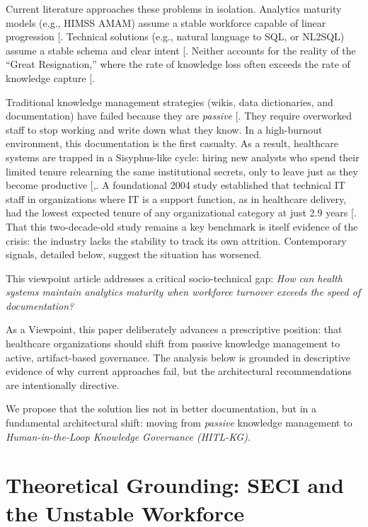 \documentclass[
  american,
  11pt,
  letterpaper,
  oneside  ,captions=tableheading
]{scrartcl}
\begin{document}
Current literature approaches these problems in isolation. Analytics
maturity models (e.g., HIMSS AMAM) assume a stable workforce capable of
linear progression {[}\citeproc{ref-himss2024}{1}{]}. Technical
solutions (e.g., natural language to SQL, or NL2SQL) assume a stable
schema and clear intent {[}\citeproc{ref-wang2020}{15}{]}. Neither
accounts for the reality of the ``Great Resignation,'' where the rate of
knowledge loss often exceeds the rate of knowledge capture
{[}\citeproc{ref-rao2006}{13}{]}.

Traditional knowledge management strategies (wikis, data dictionaries,
and documentation) have failed because they are \emph{passive}
{[}\citeproc{ref-mayo2016}{16}{]}. They require overworked staff to stop
working and write down what they know. In a high-burnout environment,
this documentation is the first casualty. As a result, healthcare
systems are trapped in a Sisyphus-like cycle: hiring new analysts who
spend their limited tenure relearning the same institutional secrets,
only to leave just as they become productive
{[},\citeproc{ref-mantas2010}{18}{]}. A
foundational 2004 study established that technical IT staff in
organizations where IT is a support function, as in healthcare delivery,
had the lowest expected tenure of any organizational category at just
2.9 years {[}\citeproc{ref-ang2004}{19}{]}. That this two-decade-old
study remains a key benchmark is itself evidence of the crisis: the
industry lacks the stability to track its own attrition. Contemporary
signals, detailed below, suggest the situation has worsened.

This viewpoint article addresses a critical socio-technical gap:
\emph{How can health systems maintain analytics maturity when workforce
turnover exceeds the speed of documentation?}

As a Viewpoint, this paper deliberately advances a prescriptive
position: that healthcare organizations should shift from passive
knowledge management to active, artifact-based governance. The analysis
below is grounded in descriptive evidence of why current approaches
fail, but the architectural recommendations are intentionally directive.

We propose that the solution lies not in better documentation, but in a
fundamental architectural shift: moving from \emph{passive} knowledge
management to \emph{Human-in-the-Loop Knowledge Governance (HITL-KG)}.

\section{Theoretical Grounding: SECI and the Unstable
Workforce}\label{theoretical-grounding-seci-and-the-unstable-workforce}
\end{document}
